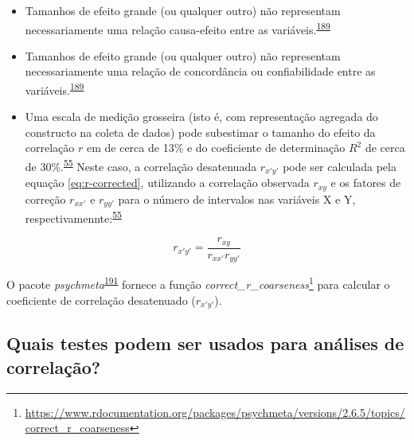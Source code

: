 \documentclass[
  a4paper,
]{book}
\renewcommand{\href}[2]{#2\footnote{\url{#1}}}
\newenvironment{infobox}[1]
  {
  \begin{itemize}
  \renewcommand{\labelitemi}{
    \raisebox{-.7\height}[0pt][0pt]{
      {\setkeys{Gin}{width=3em,keepaspectratio}
        \texttt{[image: \#1]}}
    }
  }
  \setlength{\fboxsep}{1em}
  \begin{blackbox}
  \item
  }
  {
  \end{blackbox}
  \end{itemize}
  }
\begin{document}
\begin{itemize}
\item
  Tamanhos de efeito grande (ou qualquer outro) não representam necessariamente uma relação causa-efeito entre as variáveis.\textsuperscript{\protect\hyperlink{ref-khamis2008}{189}}
\item
  Tamanhos de efeito grande (ou qualquer outro) não representam necessariamente uma relação de concordância ou confiabilidade entre as variáveis.\textsuperscript{\protect\hyperlink{ref-khamis2008}{189}}
\item
  Uma escala de medição grosseira (isto é, com representação agregada do constructo na coleta de dados) pode subestimar o tamanho do efeito da correlação \(r\) em de cerca de 13\% e do coeficiente de determinação \(R^2\) de cerca de 30\%.\textsuperscript{\protect\hyperlink{ref-aguinis2008}{55}} Neste caso, a correlação desatenuada \(r_{x'y'}\) pode ser calculada pela equação \eqref{eq:r-corrected}, utilizando a correlação observada \(r_{xy}\) e os fatores de correção \(r_{xx'}\) e \(r_{yy'}\) para o número de intervalos nas variáveis X e Y, respectivamennte:\textsuperscript{\protect\hyperlink{ref-aguinis2008}{55}}
\end{itemize}

\begin{equation}
\label{eq:r-corrected}
r_{x'y'} = \dfrac{r_{xy}}{r_{xx'}r_{yy'}}
\end{equation}

\begin{infobox}{images/Rlogo}
O pacote \emph{psychmeta}\textsuperscript{\protect\hyperlink{ref-psychmeta}{191}} fornece a função \href{https://www.rdocumentation.org/packages/psychmeta/versions/2.6.5/topics/correct_r_coarseness}{\emph{correct\_r\_coarseness}} para calcular o coeficiente de correlação desatenuado (\(r_{x'y'}\)).

\end{infobox}

\hypertarget{quais-testes-podem-ser-usados-para-anuxe1lises-de-correlauxe7uxe3o}{%
\subsection{Quais testes podem ser usados para análises de correlação?}\label{quais-testes-podem-ser-usados-para-anuxe1lises-de-correlauxe7uxe3o}}
\end{document}
